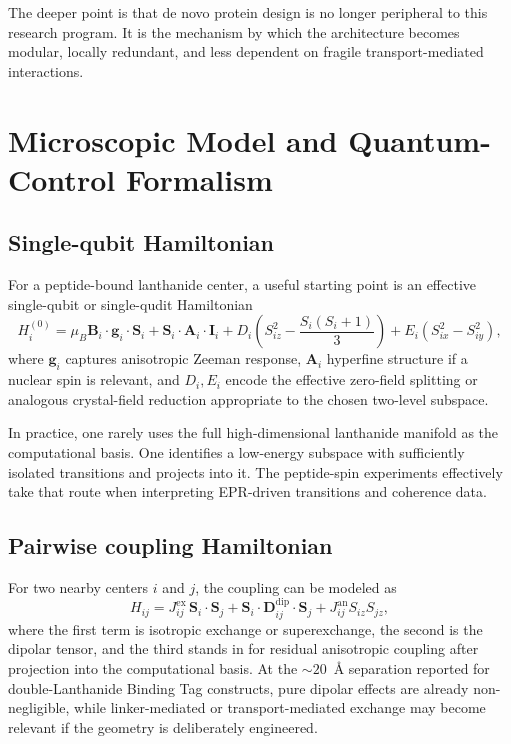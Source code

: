 \documentclass[11pt]{report}
\newcommand{\lbt}{Lanthanide Binding Tag}
\newcommand{\ham}{Hamiltonian}
\theoremstyle{definition}
\begin{document}
The deeper point is that de novo protein design is no longer peripheral to this research program. It is the mechanism by which the architecture becomes modular, locally redundant, and less dependent on fragile transport-mediated interactions.

\chapter{Microscopic Model and Quantum-Control Formalism}

\section{Single-qubit Hamiltonian}
For a peptide-bound lanthanide center, a useful starting point is an effective single-qubit or single-qudit \ham{}
\begin{equation}
H_i^{(0)} =
\mu_B \mathbf{B}_i \cdot \mathbf{g}_i \cdot \mathbf{S}_i
+ \mathbf{S}_i \cdot \mathbf{A}_i \cdot \mathbf{I}_i
+ D_i\left(S_{iz}^2 - \frac{S_i(S_i+1)}{3}\right)
+ E_i\left(S_{ix}^2 - S_{iy}^2\right),
\end{equation}
where $\mathbf{g}_i$ captures anisotropic Zeeman response, $\mathbf{A}_i$ hyperfine structure if a nuclear spin is relevant, and $D_i,E_i$ encode the effective zero-field splitting or analogous crystal-field reduction appropriate to the chosen two-level subspace.

In practice, one rarely uses the full high-dimensional lanthanide manifold as the computational basis. One identifies a low-energy subspace with sufficiently isolated transitions and projects into it. The peptide-spin experiments effectively take that route when interpreting EPR-driven transitions and coherence data.

\section{Pairwise coupling Hamiltonian}
For two nearby centers $i$ and $j$, the coupling can be modeled as
\begin{equation}
H_{ij} =
J_{ij}^{\mathrm{ex}} \, \mathbf{S}_i \cdot \mathbf{S}_j
+ \mathbf{S}_i \cdot \mathbf{D}_{ij}^{\mathrm{dip}} \cdot \mathbf{S}_j
+ J_{ij}^{\mathrm{an}} S_{iz} S_{jz},
\end{equation}
where the first term is isotropic exchange or superexchange, the second is the dipolar tensor, and the third stands in for residual anisotropic coupling after projection into the computational basis. At the $\sim 20$~\AA{} separation reported for double-\lbt{} constructs, pure dipolar effects are already non-negligible, while linker-mediated or transport-mediated exchange may become relevant if the geometry is deliberately engineered.
\end{document}
